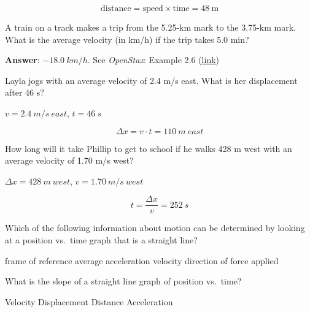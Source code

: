 \documentclass[]{exam}
\begin{document}
\begin{questions}
\begin{solution}
\begin{equation*}
    \text{distance} = \text{speed} \times \text{time} = \SI{48}{\meter} 
\end{equation*}
\end{solution}


\question
A train on a track makes a trip from the 5.25-km mark to the 3.75-km mark. What is the average velocity (in km/h) if the trip takes 5.0 min?

\begin{solution}
    \textbf{Answer}: $\SI{-18.0}{km/h}$. See \textit{OpenStax}: Example 2.6 (\href{https://openstax.org/books/college-physics/pages/2-4-acceleration}{link})
\end{solution}

\question
Layla jogs with an average velocity of 2.4 m/s east. What is her displacement after 46 s?

\begin{solution}
    $v = \SI{2.4}{m/s\ east}$, $t = \SI{46}{s}$

\begin{equation*}
    \Delta{x} = v \cdot t = \SI{110}{m\ east}
\end{equation*}
\end{solution}


\question
How long will it take Phillip to get to school if he walks 428 m west with an average velocity of 1.70 m/s west?

\begin{solution}
    $\Delta{x} = \SI{428}{m\ west}$, $v = \SI{1.70}{m/s\ west}$

\begin{equation*}
    t = \frac{\Delta{x}}{v} = \SI{252}{s}
\end{equation*}
\end{solution}


\question
Which of the following information about motion can be determined by looking at a position vs.~time graph that is a straight line?

\begin{choices}
\choice frame of reference
\choice average acceleration
\CorrectChoice velocity
\choice direction of force applied
\end{choices}

\question
What is the slope of a straight line graph of position vs.~time?

\begin{choices}
\CorrectChoice Velocity
\choice Displacement
\choice Distance
\choice Acceleration
\end{choices}


\end{questions}
\end{document}
